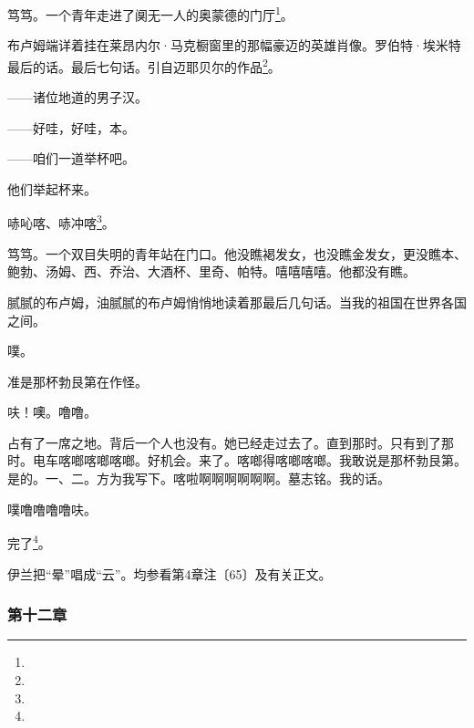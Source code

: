 \par 笃笃。一个青年走进了阒无一人的奥蒙德的门厅\footnote{}。
\par 布卢姆端详着挂在莱昂内尔·马克橱窗里的那幅豪迈的英雄肖像。罗伯特·埃米特最后的话。最后七句话。引自迈耶贝尔的作品\footnote{}。
\par ——诸位地道的男子汉。
\par ——好哇，好哇，本。
\par ——咱们一道举杯吧。
\par 他们举起杯来。
\par 哧吣喀、哧冲喀\footnote{}。
\par 笃笃。一个双目失明的青年站在门口。他没瞧褐发女，也没瞧金发女，更没瞧本、鲍勃、汤姆、西、乔治、大酒杯、里奇、帕特。嘻嘻嘻嘻。他都没有瞧。
\par 腻腻的布卢姆，油腻腻的布卢姆悄悄地读着那最后几句话。当我的祖国在世界各国之间。
\par 噗。
\par 准是那杯勃艮第在作怪。
\par 呋！噢。噜噜。
\par 占有了一席之地。背后一个人也没有。她已经走过去了。直到那时。只有到了那时。电车喀啷喀啷喀啷。好机会。来了。喀啷得喀啷喀啷。我敢说是那杯勃艮第。是的。一、二。方为我写下。喀啦啊啊啊啊啊啊。墓志铭。我的话。
\par 噗噜噜噜噜呋。
\par 完了\footnote{}。
\par 伊兰把“晕”唱成“云”。均参看第4章注〔65〕及有关正文。



\subsubsection*{第十二章}

